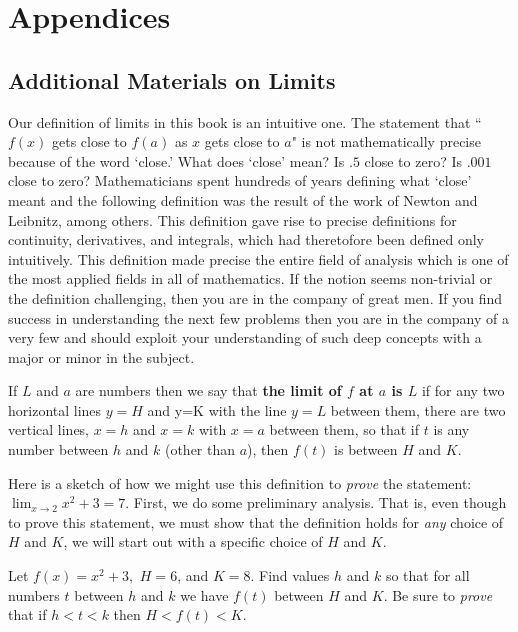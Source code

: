 \chapter{Appendices}

\section{Additional Materials on Limits} \label{applim}

\setcounter{dfn}{0}
\setcounter{prb}{0}
\setcounter{axm}{0}
\setcounter{expl}{0}
\setcounter{lem}{0}
\setcounter{thm}{0}

Our definition of limits in this book is an intuitive one.  The statement that ``$f(x)$ gets close to $f(a)$ as  $x$ gets close to $a$" is not mathematically precise because of the word `close.' What does `close' mean?  Is $.5$ close to zero?  Is $.001$ close to zero? Mathematicians spent hundreds of years defining what `close' meant and the following definition was the result of the work of Newton and Leibnitz, among others.  This definition gave rise to precise definitions for continuity, derivatives, and integrals, which had theretofore been defined only intuitively. This definition made precise the entire field of analysis which is one of the most applied fields in all of mathematics.  If the notion seems non-trivial or the definition challenging, then you are in the company of great men. If you find success in understanding the next few problems then you are in the company of a very few and should exploit your understanding of such deep concepts with a major or minor in the subject.

\begin{dfn}
If $L$ and $a$ are numbers then we say that {\bf the limit of $f$ at $a$ is $L$} if for any two horizontal lines $y=H$ and y=K with the line $y=L$ between them, there are two vertical lines, $x=h$ and $x=k$ with $x=a$ between them, so that if $t$ is any number between $h$ and $k$ (other than $a$), then $f(t)$ is between $H$ and $K$.
\end{dfn}

Here is a sketch of how we might use this definition to {\it prove} the statement: $\lim_{x \rightarrow 2} x^2 + 3 = 7.$  First, we do some preliminary analysis.  That is, even though to prove this statement, we must show that the definition holds for {\it any} choice of $H$ and $K$, we will start out with a specific choice of $H$ and $K$.

\begin{prb}
Let $f(x) = x^2 + 3,$ $H=6$, and $K=8$.  Find values $h$ and $k$ so that for all numbers $t$ between $h$ and $k$ we have $f(t)$ between $H$ and $K$. Be sure to {\it prove} that if $h < t < k$ then $H < f(t) < K$.
\end{prb}

